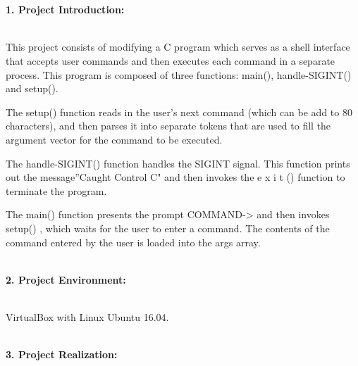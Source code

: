 \documentclass[12pt,a4paper]{article}
\begin{document}
\noindent

\noindent{}
~\\
~\\
\begin{large}
\textbf{1. Project Introduction:}
\end{large}
~\\


This project consists of modifying a C program which serves as a shell interface that accepts user commands and then executes each command in a separate process. This program is composed of three functions: main(), handle-SIGINT() and setup(). 

The setup() function reads in the user's next command (which can be add to 80 characters), and then parses it into separate tokens that are used to fill the argument vector for the command to be executed.

The handle-SIGINT() function handles the SIGINT signal. This function prints out the message''Caught Control C" and then invokes the e x i t () function to terminate the program.

The main() function presents the prompt COMMAND-> and then invokes setup() , which waits for the user to enter a command. The contents of the command entered by the user is loaded into the args array.
~\\
~\\
\begin{large}
\textbf{2. Project Environment:}
\end{large}
~\\

VirtualBox with Linux Ubuntu 16.04.
~\\
~\\
\begin{large}
\textbf{3. Project Realization:}
\end{large}
~\\
\end{document}
